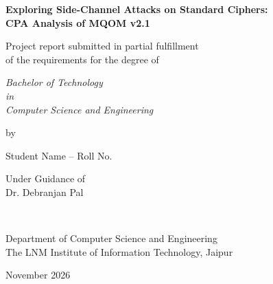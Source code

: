 \thispagestyle{empty}
\begin{center}
{\Large \bf Exploring Side-Channel Attacks on Standard Ciphers:\\
CPA Analysis of MQOM v2.1 }


\vspace*{1.75cm}
{\large Project report submitted in partial fulfillment\\}
{\large  of the requirements for the degree of \\}

\vspace*{1cm}
{\it {\large Bachelor of Technology} \\
{\large in\\}
{\large Computer Science and Engineering \\}}

\vspace*{1cm}
{\large by}

\vspace*{1cm}
{\large Student Name -- Roll No. \\}

\vspace*{5mm}
{\large Under Guidance of \\}
{\large Dr. Debranjan Pal \\}

\vspace*{1.0cm}
{\\}

\vspace*{2.0cm}
{\large Department of Computer Science and Engineering \\}
{\large The LNM Institute of Information Technology, Jaipur\\}

\vspace*{1.0cm}
{\large November 2026\\}
\end{center}

\clearpage
